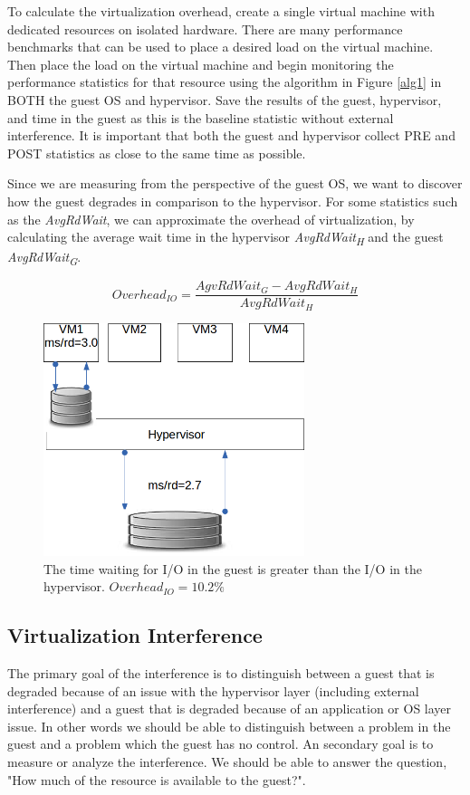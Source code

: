 To calculate the virtualization overhead, create a single virtual machine with dedicated resources on isolated hardware.  
There are many performance benchmarks that can be used \cite{katcher, tikotekar, hplBench} to place a desired load on the virtual machine. 
Then place the load on the virtual machine and begin monitoring the performance statistics for that resource using the algorithm in Figure \ref{alg1} in BOTH the guest OS and hypervisor. 
Save the results of the guest, hypervisor, and time in the guest as this is the baseline statistic without external interference.
It is important that both the guest and hypervisor collect PRE and POST statistics as close to the same time as possible.  

Since we are measuring from the perspective of the guest OS, we want to discover how the guest degrades in comparison to the hypervisor.  
For some statistics such as the \emph{AvgRdWait}, we can approximate the overhead of virtualization, by calculating the average wait time in the hypervisor \emph{AvgRdWait\textsubscript{H}} and the guest \emph{AvgRdWait\textsubscript{G}}.

\begin{equation}
  Overhead_{IO} = \frac{AgvRdWait_G - AvgRdWait_H}{AvgRdWait_H} 
\end{equation}

\begin{figure}[h]
  \begin{center}
  \includegraphics[width=3in]{images/RPS_single.png}
  \caption{The time waiting for I/O in the guest is greater than the I/O in the hypervisor. $Overhead_{IO}=10.2\%$}
  \label{RPSsingle}
  \end{center}
\end{figure}

\subsection{Virtualization Interference}
The primary goal of the interference is to distinguish between a guest that is degraded because of an issue with the hypervisor layer (including external interference) and a guest that is degraded because of an application or OS layer issue.  In other words we should be able to distinguish between a problem in the guest and a problem which the guest has no control.  An secondary goal is to measure or analyze the interference.  We should be able to answer the question, "How much of the resource is available to the guest?".

